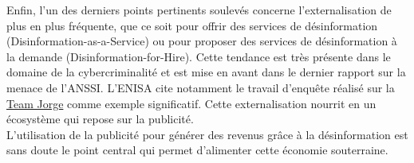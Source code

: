 \documentclass[a4paper]{article}
\begin{document}
Enfin, l'un des derniers points pertinents soulevés concerne l'externalisation de plus en plus fréquente, que ce soit pour offrir des services de désinformation (Disinformation-as-a-Service) ou pour proposer des services de désinformation à la demande (Disinformation-for-Hire). Cette tendance est très présente dans le domaine de la cybercriminalité et est mise en avant dans le dernier rapport sur la menace de l'ANSSI. L'ENISA cite notamment le travail d'enquête réalisé sur la \href{https://www.theguardian.com/world/2023/feb/15/aims-software-avatars-team-jorge-disinformation-fake-profiles}{Team Jorge} comme exemple significatif. Cette externalisation nourrit en un écosystème qui repose sur la publicité.
\\
L’utilisation de la publicité pour générer des revenus grâce à la désinformation est sans doute le point central qui permet d’alimenter cette économie souterraine.
\end{document}
